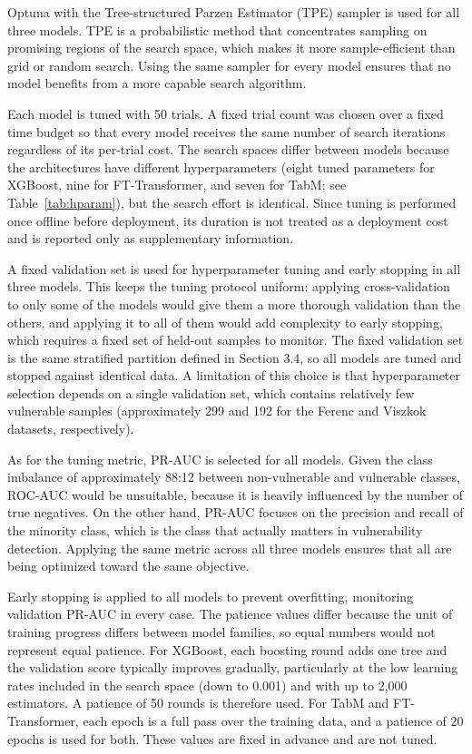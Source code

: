 Optuna with the Tree-structured Parzen Estimator (TPE) sampler is used for all three models. TPE is a probabilistic method that concentrates sampling on promising regions of the search space, which makes it more sample-efficient than grid or random search. Using the same sampler for every model ensures that no model benefits from a more capable search algorithm.

Each model is tuned with 50 trials. A fixed trial count was chosen over a fixed time budget so that every model receives the same number of search iterations regardless of its per-trial cost. The search spaces differ between models because the architectures have different hyperparameters (eight tuned parameters for XGBoost, nine for FT-Transformer, and seven for TabM; see Table~\ref{tab:hparam}), but the search effort is identical. Since tuning is performed once offline before deployment, its duration is not treated as a deployment cost and is reported only as supplementary information. 

A fixed validation set is used for hyperparameter tuning and early stopping in all three models. This keeps the tuning protocol uniform: applying cross-validation to only some of the models would give them a more thorough validation than the others, and applying it to all of them would add complexity to early stopping, which requires a fixed set of held-out samples to monitor. The fixed validation set is the same stratified partition defined in Section 3.4, so all models are tuned and stopped against identical data. A limitation of this choice is that hyperparameter selection depends on a single validation set, which contains relatively few vulnerable samples (approximately 299 and 192 for the Ferenc and Viszkok datasets, respectively).

As for the tuning metric, PR-AUC is selected for all models. Given the class imbalance of approximately 88:12 between non-vulnerable and vulnerable classes, ROC-AUC would be unsuitable, because it is heavily influenced by the number of true negatives. On the other hand, PR-AUC focuses on the precision and recall of the minority class, which is the class that actually matters in vulnerability detection. Applying the same metric across all three models ensures that all are being optimized toward the same objective.

Early stopping is applied to all models to prevent overfitting, monitoring validation PR-AUC in every case. The patience values differ because the unit of training progress differs between model families, so equal numbers would not represent equal patience. For XGBoost, each boosting round adds one tree and the validation score typically improves gradually, particularly at the low learning rates included in the search space (down to 0.001) and with up to 2,000 estimators. A patience of 50 rounds is therefore used. For TabM and FT-Transformer, each epoch is a full pass over the training data, and a patience of 20 epochs is used for both. These values are fixed in advance and are not tuned.

